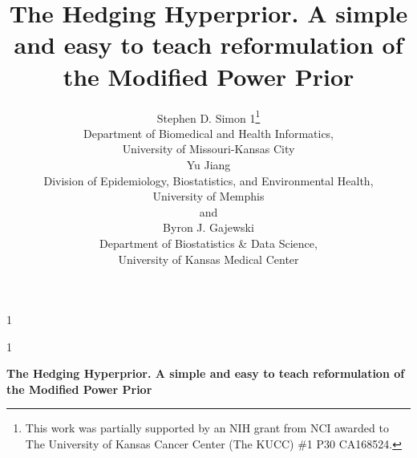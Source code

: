 \documentclass[12pt]{article}
\newcommand{\blind}{1}
\begin{document}
%

\def\spacingset#1{\renewcommand{\baselinestretch}%
{#1}\small\normalsize} \spacingset{1}



\blind
{
  \title{\bf The Hedging Hyperprior. A simple and easy to teach reformulation of the Modified Power Prior}
  \author{Stephen D. Simon 1\thanks{
    This work was partially supported by an NIH grant from NCI awarded to The University of Kansas Cancer Center (The KUCC) \#1 P30 CA168524.}\hspace{.2cm}\\
    Department of Biomedical and Health Informatics,\\University of Missouri-Kansas City\\
    Yu Jiang\\
    Division of Epidemiology, Biostatistics, and Environmental Health,\\University of Memphis\\
    and \\
    Byron J. Gajewski\\
    Department of Biostatistics \& Data Science,\\University of Kansas Medical Center}
  \maketitle
} \fi

\blind
{
  \bigskip
  \bigskip
  \bigskip
  \begin{center}
    {\LARGE\bf The Hedging Hyperprior. A simple and easy to teach reformulation of the Modified Power Prior}
\end{center}
  \medskip
} \fi
\end{document}

